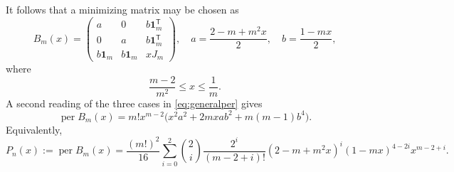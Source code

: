 \documentclass[11pt]{article}
\theoremstyle{remark}
\newcommand{\per}{\operatorname{per}}
\newcommand{\one}{\mathbf{1}}
\begin{document}
It follows that a minimizing matrix may be chosen as
\begin{equation}\label{eq:Bmx}
 B_m(x)=
 \begin{pmatrix}
 a&0&b\one_m^{\mathsf T}\\
 0&a&b\one_m^{\mathsf T}\\
 b\one_m&b\one_m&xJ_m
 \end{pmatrix},
 \quad
 a=\frac{2-m+m^2x}{2},\quad b=\frac{1-mx}{2},
\end{equation}
where
\begin{equation}\label{eq:xrange}
 \frac{m-2}{m^2}\le x\le\frac1m.
\end{equation}
A second reading of the three cases in \eqref{eq:generalper} gives
\begin{equation}\label{eq:simplePn}
 \per B_m(x)=m!x^{m-2}
 \bigl(x^2a^2+2mxab^2+m(m-1)b^4\bigr).
\end{equation}
Equivalently,
\begin{equation}\label{eq:Pn}
 P_n(x):=\per B_m(x)
 =\frac{(m!)^2}{16}\sum_{i=0}^2
 \binom2i\frac{2^i}{(m-2+i)!}
 (2-m+m^2x)^i(1-mx)^{4-2i}x^{m-2+i}.
\end{equation}
\end{document}
